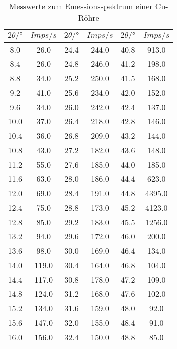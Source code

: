 \begin{table}[H]
    \centering
    \caption{Messwerte zum Emessionsspektrum einer Cu-Röhre}
    \label{tab:2}
    \begin{tabular}{c c | c c | c c}
        \toprule
        $2 \theta /° $ & $Imps/s$ & $2 \theta /° $ & $Imps/s$ & $2 \theta /°$ & $Imps/s$  \\
        \midrule
        8.0	  &   26.0    &  24.4	&  244.0  & 40.8  &  913.0   \\                    
        8.4	  &   26.0    &  24.8	&  246.0  & 41.2  &  198.0   \\                   
        8.8	  &   34.0    &  25.2	&  250.0  & 41.5  &  168.0  \\
        9.2	  &   41.0    &  25.6	&  234.0  & 42.0  &  152.0  \\
        9.6	  &   34.0    &  26.0	&  242.0  & 42.4  &  137.0  \\
        10.0  &	  37.0    &  26.4	&  218.0  & 42.8  &  146.0  \\
        10.4  &	  36.0    &  26.8	&  209.0  & 43.2  &  144.0  \\
        10.8  &	  43.0    &  27.2	&  182.0  & 43.6  &  148.0  \\
        11.2  &	  55.0    &  27.6	&  185.0  & 44.0  &  185.0  \\
        11.6  &	  63.0    &  28.0	&  186.0  & 44.4  &  623.0  \\
        12.0  &	  69.0    &  28.4	&  191.0  & 44.8  &  4395.0  \\
        12.4  &	  75.0    &  28.8	&  173.0  & 45.2  &  4123.0  \\
        12.8  &	  85.0    &  29.2	&  183.0  & 45.5  &  1256.0  \\
        13.2  &	  94.0    &  29.6	&  172.0  & 46.0  &  200.0  \\
        13.6  &	  98.0    &  30.0	&  169.0  & 46.4  &  134.0  \\
        14.0  &	  119.0   &  30.4	&  164.0  & 46.8  &  104.0  \\
        14.4  &	  117.0   &  30.8	&  178.0  & 47.2  &  109.0  \\
        14.8  &	  124.0   &  31.2	&  168.0  & 47.6  &  102.0  \\
        15.2  &	  134.0   &  31.6	&  159.0  & 48.0  &  92.0  \\
        15.6  &	  147.0   &  32.0	&  155.0  & 48.4  &  91.0  \\
        16.0  &	  156.0   &  32.4	&  150.0  & 48.8  &  85.0  \\

\end{tabular}
\end{table}
